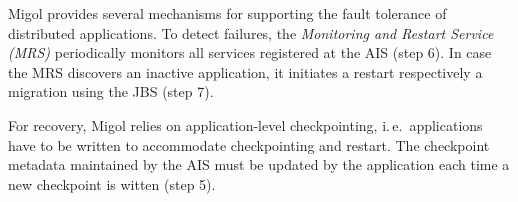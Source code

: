 \documentclass[times, 10pt, twocolumn]{article}
\begin{document}
             

Migol provides several mechanisms for supporting the fault tolerance of 
distributed applications.
To detect failures, the \emph{Monitoring and Restart Service (MRS)}
periodically monitors all services registered at the AIS (step 6). 
In case the MRS discovers an inactive application, 
it initiates a restart respectively a migration using the JBS (step 7).

For recovery, Migol relies on application-level checkpointing, i.\,e.\
applications have to be written to accommodate checkpointing and
restart.  The checkpoint metadata maintained by the AIS must be updated by the application
each time a new checkpoint is witten  (step 5).

\end{document}
